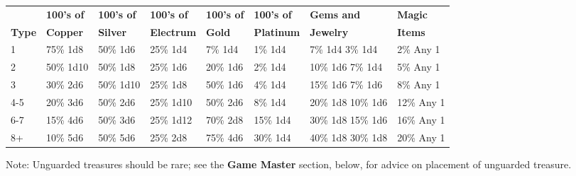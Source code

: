 \documentclass[a4paper,twoside,openany,10pt]{book}
\begin{document}
\begin{tabular*}{0.97\linewidth}{@{\extracolsep{\fill}}llllllll}
&\textbf{100's of}&\textbf{100's of}&\textbf{100's of}&\textbf{100's of}&\textbf{100's of}&\textbf{Gems and}&\textbf{Magic}\\
\textbf{Type} & \textbf{Copper} & \textbf{Silver} & \textbf{Electrum} & \textbf{Gold} & \textbf{Platinum} & \textbf{Jewelry} & \textbf{Items} \\\toprule
1 & 75\% 1d8  & 50\% 1d6 & 25\% 1d4 & 7\% 1d4 & 1\% 1d4 & 7\% 1d4 3\% 1d4 & 2\% Any 1 \\\hline
2 & 50\% 1d10 & 50\% 1d8 & 25\% 1d6 & 20\% 1d6 & 2\% 1d4 & 10\% 1d6 7\% 1d4 &  5\% Any 1 \\\hline
3 & 30\% 2d6 & 50\% 1d10 & 25\% 1d8 & 50\% 1d6 & 4\% 1d4 & 15\% 1d6 7\% 1d6 & 8\% Any 1 \\\hline
4-5 & 20\% 3d6 & 50\% 2d6 & 25\% 1d10 & 50\% 2d6 & 8\% 1d4 & 20\% 1d8 10\% 1d6  & 12\% Any 1 \\\hline
6-7 & 15\% 4d6 & 50\% 3d6 & 25\% 1d12 & 70\% 2d8 & 15\% 1d4 & 30\% 1d8 15\% 1d6 & 16\% Any 1 \\\hline
8+ & 10\% 5d6 & 50\% 5d6 & 25\% 2d8 & 75\% 4d6 & 30\% 1d4 & 40\% 1d8 30\% 1d8  &  20\% Any 1 \\\bottomrule
\end{tabular*}

Note: Unguarded treasures should be rare; see the \textbf{Game Master}
section, below, for advice on placement of unguarded treasure.
\end{document}
